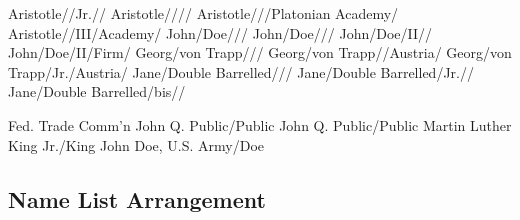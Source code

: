 \documentclass{article}
\begin{document}
\def\TestNameSplit#1#2#3#4#5#6{#6{#1/#2/#3/#4/#5}}
    {Aristotle//Jr.//}
    {Aristotle////\hi@etal}
    {Aristotle///Platonian Academy/}
    {Aristotle//III/Academy/}
    {John/Doe///}
    {John/Doe///\hi@etal}
    {John/Doe/II//\hi@etal}
    {John/Doe/II/Firm/\hi@etal}
    {Georg/von Trapp///}
    {Georg/von Trapp//Austria/}
    {Georg/von Trapp/Jr./Austria/}
    {Jane/Double Barrelled///}
    {Jane/Double Barrelled/Jr.//}
    {Jane/Double Barrelled/bis//}

    {Fed. Trade Comm'n}
\def\TestNameprocPerson#1#2#3{#3{#1/#2}}
\AssertCallback
    {\TestNameprocPerson}
    {John Q. Public/Public}
\AssertCallback
    {\TestNameprocPerson}
    {John Q. Public\hi@etal/Public\hi@etal}
\AssertCallback
    {\TestNameprocPerson}
    {Martin Luther King Jr.\hi@etal/King\hi@etal}
\AssertCallback
    {\TestNameprocPerson}
    {John Doe, U.S. Army/Doe}

\subsection{Name List Arrangement}

\begingroup

\hi@undefine\hi@kv@test
\let\hi@param@set@hooks\relax
{}\hi@kv@test
\AssertMacro{}
\hi@kv@test
\AssertMacro{}
\hi@kv@test
\AssertMacro{}
\hi@kv@test
\AssertMacro{}
\hi@kv@test
\AssertMacro{}
\end{document}
